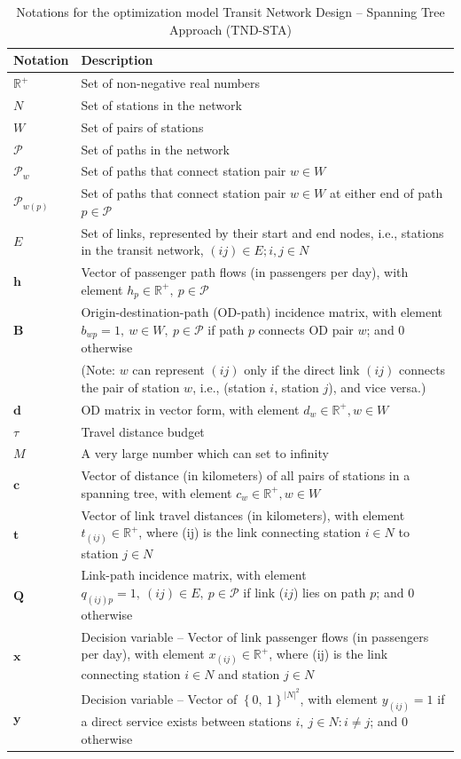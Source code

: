 \documentclass[10pt,english]{article}
\begin{document}
\begin{table}[H]
  \centering
  \caption{Notations for the optimization model Transit Network Design -- Spanning Tree Approach (TND-STA)}
    \begin{tabular}{lp{13cm}}
    \toprule
    Notation & Description \\
    \midrule
    $\mathbb{R}^+$ & Set of non-negative real numbers\\
    $N$ & Set of stations in the network \\
    $W$ & Set of pairs of stations \\
    $\mathcal{P}$ & Set of paths in the network\\
    $\mathcal{P}_w$ & Set of paths that connect station pair $w\in W$\\
    $\mathcal{P}_{w\left(p\right)}$ & Set of paths that connect station pair $w\in W$ at either end of path $p\in\mathcal{P}$\\
    $E$ & Set of links, represented by their start and end nodes, i.e., stations in the transit network, $\left(ij\right)\in E;i,j\in N$ \\
    $\boldsymbol{h}$ & Vector of passenger path flows (in passengers per day), with element $h_p\in\mathbb{R}^+,\ p\in\mathcal{P}$ \\
    $\boldsymbol{B}$ & Origin-destination-path (OD-path) incidence matrix, with element $b_{wp}=1,\ w\in W,\ p\in\mathcal{P}$ if path $p$ connects OD pair $w$; and 0 otherwise \\
     & (Note: $w$ can represent $\left(ij\right)$ only if the direct link $\left(ij\right)$ connects the pair of station $w$, i.e., (station $i$, station $j$), and vice versa.)\\
    $\boldsymbol{d}$ & OD matrix in vector form, with element $d_w\in\mathbb{R}^+,w\in W$ \\
    $\tau$ & Travel distance budget \\
    $M$ & A very large number which can set to infinity \\
    $\boldsymbol{c}$ & Vector of distance (in kilometers) of all pairs of stations in a spanning tree, with element $c_w\in\mathbb{R}^+,w\in W$ \\
    $\boldsymbol{t}$ & Vector of link travel distances (in kilometers), with element $t_{\left(ij\right)}\in\mathbb{R}^+$, where (ij) is the link connecting station $i\in N$ to station $j\in N$ \\
    $\boldsymbol{Q}$ & Link-path incidence matrix, with element $q_{\left(ij\right)p}=1,\ \left(ij\right)\in E,\ p\in\mathcal{P}$ if link ($ij$) lies on path $p$; and 0 otherwise \\
    $\boldsymbol{x}$ & Decision variable -- Vector of link passenger flows (in passengers per day), with element $x_{\left(ij\right)}\in\mathbb{R}^+$, where (ij) is the link connecting station $i\in N$ and station $j\in N$ \\
    $\boldsymbol{y}$ & Decision variable -- Vector of $\left\{0,\ 1\right\}^{\left|N\right|^2}$, with element $y_{\left(ij\right)}=1$ if a direct service exists between stations $i,\ j\in N:i\neq j$; and 0 otherwise \\
    \bottomrule
    \end{tabular}%
  \label{tab:notations}%


\end{table}
\end{document}
